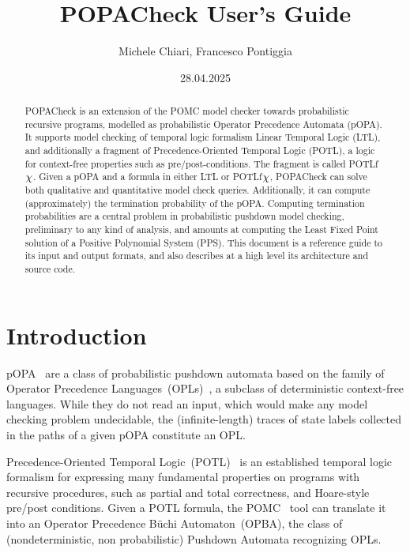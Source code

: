 \documentclass[9pt,a4paper]{article}
\title{POPACheck User's Guide}
\author{Michele Chiari, Francesco Pontiggia}
\date{28.04.2025}
\begin{document}
\maketitle


\begin{abstract}
POPACheck is an extension of the POMC model checker towards probabilistic recursive programs, modelled as probabilistic Operator Precedence Automata (pOPA). It supports model checking of temporal logic formalism Linear Temporal Logic (LTL), and additionally a fragment of Precedence-Oriented Temporal Logic (POTL), a logic for context-free properties such as pre/post-conditions. The fragment is called POTLf$\chi$. Given a pOPA and a formula in either LTL or POTLf$\chi$, POPACheck can solve both qualitative and quantitative model check queries. Additionally, it can compute (approximately) the termination probability of the pOPA. Computing termination probabilities are a central problem in probabilistic pushdown model checking, preliminary to any kind of analysis, and amounts at computing the Least Fixed Point solution of a Positive Polynomial System (PPS).
This document is a reference guide to its input and output formats, and also describes at a high level its architecture and source code.
\end{abstract}

\section{Introduction}
pOPA~\cite{abs-2404-03515} are a class of probabilistic pushdown automata based on the family of Operator Precedence Languages~(OPLs)~\cite{MP18},
a subclass of deterministic context-free languages.
While they do not read an input, which would make any model checking problem undecidable, the (infinite-length) traces of state labels collected in the paths of a given pOPA constitute an OPL.

Precedence-Oriented Temporal Logic~(POTL)~\cite{ChiariMP21,ChiariMP21b} is an established temporal
logic formalism for expressing many fundamental properties on programs with recursive procedures, such as partial and total correctness, and Hoare-style pre/post conditions.
Given a POTL formula, the POMC~\cite{ChiariMPP23} tool can translate it into an Operator Precedence Büchi Automaton~(OPBA), the class of (nondeterministic, non probabilistic) Pushdown Automata recognizing OPLs.
\end{document}
